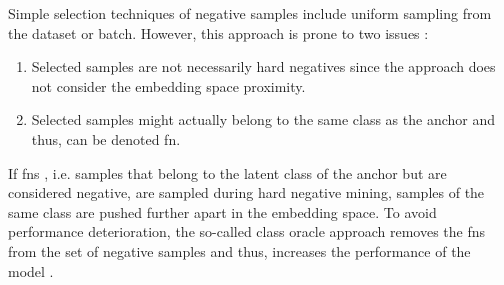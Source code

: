 Simple selection techniques of negative samples include uniform sampling from the dataset or batch.
However, this approach is prone to two issues \citet{robinson_contrastive_2021,mining_potential_2024}:
\begin{enumerate}
    \item Selected samples are not necessarily hard negatives since the approach does not consider the embedding space proximity.
    \item Selected samples might actually belong to the same class as the anchor and thus, can be denoted \ac{fn}.
\end{enumerate}

If \acp{fn} \cite{grape_2024,curricular_weighting_2024,progcl_2022}, i.e. 
samples that belong to the latent class of the anchor but are considered negative, 
are sampled during hard negative mining, 
samples of the same class are pushed further apart in the embedding space. 
To avoid performance deterioration, the so-called class oracle approach 
removes the \acp{fn} from the set of negative samples and thus, 
increases the performance of the model \citet{mochi_2020}.